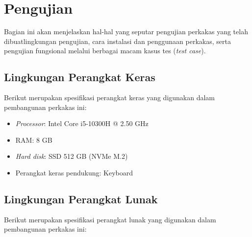 \section{Pengujian}
\label{sec:testing-experiments}

Bagian ini akan menjelaskan hal-hal yang seputar pengujian perkakas yang telah dibuat\textemdash lingkungan pengujian, cara instalasi dan penggunaan perkakas, serta pengujian fungsional melalui berbagai macam kasus tes (\textit{test case}).

\subsection{Lingkungan Perangkat Keras}
\label{sec:testing-experiments-hardware}

Berikut merupakan spesifikasi perangkat keras yang digunakan dalam pembangunan perkakas ini:

\begin{itemize}
	\item \textit{Processor}: Intel\logoregistered\xspace Core\logotrademark\xspace i5-10300H @ 2.50 GHz
	\item RAM: 8 GB
	\item \textit{Hard disk}: SSD 512 GB (NVMe\logotrademark\xspace M.2)
	\item Perangkat keras pendukung: Keyboard
\end{itemize}

\subsection{Lingkungan Perangkat Lunak}
\label{sec:testing-experiments-software}

Berikut merupakan spesifikasi perangkat lunak yang digunakan dalam pembangunan perkakas ini:

